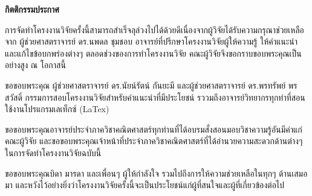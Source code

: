 \thispagestyle{empty}
\vspace{2 cm}
{\huge \bf กิตติกรรมประกาศ}
\vspace{2 cm}

\hspace{1cm}การจัดทำโครงงานวิจัยครั้งนี้สามารถสำเร็จลุล่วงไปได้ด้วยดีเนื่องจากผู้วิจัยได้รับความกรุณาช่วยเหลือจาก ผู้ช่วยศาสตราจารย์ ดร.นพดล ชุมชอบ อาจารย์ที่ปรึกษาโครงงานวิจัยผู้ให้ความรู้ ให้คำแนะนำและแก้ไขข้อบกพร่องต่างๆ ตลอดช่วงของการทำโครงงานวิจัย คณะผู้วิจัยจึงขอกราบขอบพระคุณเป็นอย่างสูง ณ โอกาสนี้

\hspace{1cm}ขอขอบพระคุณ ผู้ช่วยศาสตราจารย์ ดร.นัยน์รัตน์ กันยะมี และผู้ช่วยศาสตราจารย์ ดร.พรทรัพย์ พรสวัสดิ์ กรรมการสอบโครงงานวิจัยสำหรับคำแนะนำที่มีประโยชน์ รววมถึงอาจารย์วิทยากรทุกท่าที่สอนใช้งานโปรแกรมเลเท็กซ์ (LaTex)

\hspace{1cm}ขอขอบพระคุณอาจารย์ประจำภาควิชาคณิตศาสตร์ทุกท่านที่ได้อบรมสั่งสอนมอบวิชาความรู้อันมีค่าแก่คณะผู้วิจัย และขอขอบพระคุณเจ้าหน้าที่ประจำภาควิชาคณิตศาสตร์ที่ได้อำนวยความสะดวกด้านต่างๆ ในการจัดทำโครงงานวิจัยฉบับนี้

\hspace{1cm}ขอขอบพระคุณบิดา มารดา และเพื่อนๆ ผู้ให้กำลังใจ รวมไปถึงการให้ความช่วยเหลือในทุกๆ ด้านเสมอมา และหวังไว้อย่างยิ่งว่าโครงงานวิจัยครั้งนี้จะเป็นประโยชน์แก่ผู้ที่สนใจและผู้ที่เกี่ยวข้องต่อไป



\newpage